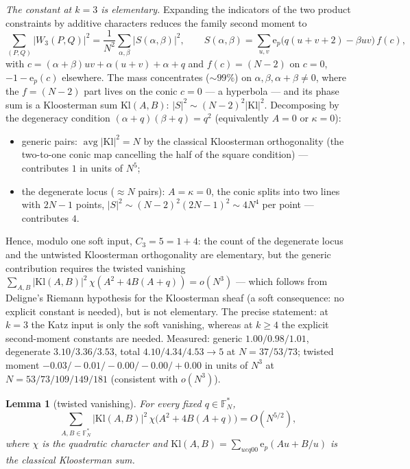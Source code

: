 \documentclass[11pt,reqno]{amsart}
\newtheorem{lemma}[theorem]{Lemma}
\theoremstyle{definition}
\newcommand{\FF}{\mathbb{F}}
\newcommand{\ep}{\mathrm{e}_p}
\newcommand{\Kl}{\mathrm{Kl}}
\begin{document}
\emph{The constant at $k=3$ is elementary.}  Expanding the indicators of the
two product constraints by additive characters reduces the family second
moment to
\[
  \sum_{(P,Q)}|W_3(P,Q)|^2=\frac1{N^2}\sum_{\alpha,\beta}
  |S(\alpha,\beta)|^2,\qquad
  S(\alpha,\beta)=\sum_{u,v} \ep\bigl(q(u+v+2)-\beta uv\bigr)\,f(c),
\]
with $c=(\alpha+\beta)uv+\alpha(u+v)+\alpha+q$ and $f(c)=(N-2)$ on $c=0$,
$-1-\ep(c)$ elsewhere.  The mass concentrates ($\sim99\%$) on
$\alpha,\beta,\alpha+\beta\neq0$, where the $f=(N-2)$ part lives on the conic
$c=0$ --- a hyperbola --- and its phase sum is a Kloosterman sum
$\Kl(A,B)$: $|S|^2\sim(N-2)^2|\Kl|^2$.  Decomposing by the degeneracy
condition $(\alpha+q)(\beta+q)=q^2$ (equivalently $A=0$ or $\kappa=0$):
\begin{itemize}
\item generic pairs: $\operatorname{avg}|\Kl|^2=N$ by the classical
Kloosterman orthogonality (the two-to-one conic map cancelling the half of
the square condition) --- contributes $1$ in units of $N^5$;
\item the degenerate locus ($\approx N$ pairs): $A=\kappa=0$, the conic
splits into two lines with $2N-1$ points, $|S|^2\sim(N-2)^2(2N-1)^2\sim4N^4$
per point --- contributes $4$.
\end{itemize}
Hence, modulo one soft input, $C_3=5=1+4$: the count of the degenerate
locus and the untwisted Kloosterman orthogonality are elementary, but the
generic contribution requires the twisted vanishing
$\sum_{A,B}|\Kl(A,B)|^2\,\chi(A^2+4B(A+q))=o(N^3)$ --- which follows from
Deligne's Riemann hypothesis for the Kloosterman sheaf (a soft consequence:
no explicit constant is needed), but is not elementary.  The precise
statement: at $k=3$ the Katz input is only the soft vanishing, whereas at
$k\ge4$ the explicit second-moment constants are needed.  Measured: generic
$1.00/0.98/1.01$, degenerate $3.10/3.36/3.53$, total
$4.10/4.34/4.53\to5$ at $N=37/53/73$; twisted moment
$-0.03/-0.01/-0.00/-0.00/+0.00$ in units of $N^3$ at
$N=53/73/109/149/181$ (consistent with $o(N^3)$).

\begin{lemma}[twisted vanishing]\label{lem:twisted}
For every fixed $q\in\FF_N^*$,
\[
  \sum_{A,B\in\FF_N^*}|\Kl(A,B)|^2\,
  \chi\bigl(A^2+4B(A+q)\bigr)=O(N^{5/2}),
\]
where $\chi$ is the quadratic character and $\Kl(A,B)=\sum_{u
eq00}
\ep(Au+B/u)$ is the classical Kloosterman sum.
\end{lemma}
\end{document}
